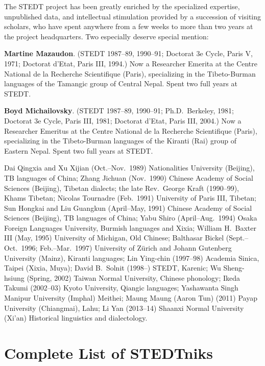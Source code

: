 The STEDT project has been greatly enriched by the specialized expertise, unpublished data, and intellectual stimulation provided by a succession of visiting scholars, who have spent anywhere from a few weeks to more than two years at the project headquarters. Two especially deserve special mention:

\textbf{Martine Mazaudon}. (STEDT 1987–89, 1990–91; Doctorat 3e Cycle, Paris V, 1971; Doctorat d’Etat, Paris III, 1994.) Now a Researcher Emerita at the Centre National de la Recherche Scientifique (Paris), specializing in the Tibeto-Burman languages of the Tamangic group of Central Nepal. Spent two full years at STEDT.

\textbf{Boyd Michailovsky}. (STEDT 1987–89, 1990–91; Ph.D.\ Berkeley, 1981; Doctorat 3e Cycle, Paris III, 1981; Doctorat d’Etat, Paris III, 2004.) Now a Researcher Emeritus at the Centre National de la Recherche Scientifique (Paris), specializing in the Tibeto-Burman languages of the Kiranti (Rai) group of Eastern Nepal. Spent two full years at STEDT.

{\sc Dai} Qingxia and {\sc Xu} Xijian (Oct.–Nov.\ 1989) Nationalities University (Beijing), TB languages of China; {\sc Zhang} Jichuan (Nov.\ 1990) Chinese Academy of Social Sciences (Beijing), Tibetan dialects; the late Rev.\ George Kraft (1990–99), Khams Tibetan; Nicolas Tournadre (Feb.\ 1991) University of Paris III, Tibetan; {\sc Sun} Hongkai and {\sc Liu} Guangkun (April–May, 1991) Chinese Academy of Social Sciences (Beijing), TB languages of China; {\sc Yabu} Shiro (April–Aug.\ 1994) Osaka Foreign Languages University, Burmish languages and Xixia; William H.\ Baxter III (May, 1995) University of Michigan, Old Chinese; Balthasar Bickel (Sept.–Oct.\ 1996; Feb.–Mar.\ 1997) University of Z\"urich and Johann Gutenberg University (Mainz), Kiranti languages; {\sc Lin} Ying-chin (1997–98) Academia Sinica, Taipei (Xixia, Muya); David B.\ Solnit (1998–) STEDT, Karenic; {\sc Wu} Sheng-hsiung (Spring, 2002) Taiwan Normal University, Chinese phonology; {\sc Ikeda} Takumi (2002–03) Kyoto University, Qiangic languages; Yashawanta Singh  Manipur University (Imphal) Meithei; Maung Maung (Aaron Tun) (2011) Payap University (Chiangmai), Lahu; {\sc Li} Yan (2013–14) Shaanxi Normal University (Xi’an) Historical linguistics and dialectology.

\section{Complete List of STEDTniks}


